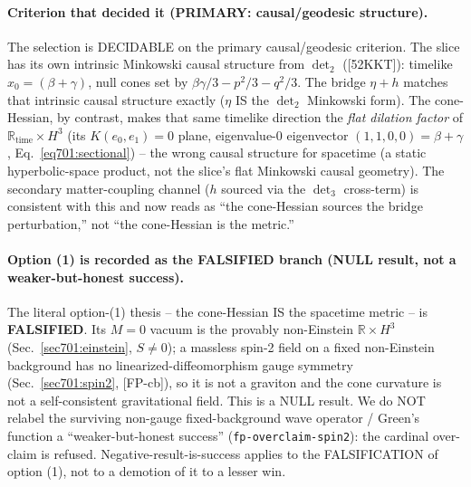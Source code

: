 \paragraph{Criterion that decided it (PRIMARY: causal/geodesic structure).} The selection
is DECIDABLE on the primary causal/geodesic criterion. The slice has its own intrinsic
Minkowski causal structure from $\det_2$ ([52KKT]): timelike $x_0=(\beta+\gamma)$, null
cones set by $\beta\gamma/3-p^2/3-q^2/3$. The bridge $\eta+h$ matches that intrinsic causal
structure exactly ($\eta$ IS the $\det_2$ Minkowski form). The cone-Hessian, by contrast,
makes that same timelike direction the \emph{flat dilation factor} of
$\mathbb{R}_{\text{time}}\times H^3$ (its $K(e_0,e_1)=0$ plane, eigenvalue-$0$ eigenvector
$(1,1,0,0)=\beta+\gamma$, Eq.~\eqref{eq701:sectional}) -- the wrong causal structure for
spacetime (a static hyperbolic-space product, not the slice's flat Minkowski causal
geometry). The secondary matter-coupling channel ($h$ sourced via the $\det_3$ cross-term)
is consistent with this and now reads as ``the cone-Hessian sources the bridge
perturbation,'' not ``the cone-Hessian is the metric.''

\paragraph{Option (1) is recorded as the FALSIFIED branch (NULL result, not a
weaker-but-honest success).} The literal option-(1) thesis -- the cone-Hessian IS the
spacetime metric -- is \textbf{FALSIFIED}. Its $M=0$ vacuum is the provably non-Einstein
$\mathbb{R}\times H^3$ (Sec.~\ref{sec701:einstein}, $S\neq0$); a massless spin-2 field on a
fixed non-Einstein background has no linearized-diffeomorphism gauge symmetry
(Sec.~\ref{sec701:spin2}, [FP-cb]), so it is not a graviton and the cone curvature is not a
self-consistent gravitational field. This is a NULL result. We do NOT relabel the
surviving non-gauge fixed-background wave operator / Green's function a
``weaker-but-honest success'' (\texttt{fp-overclaim-spin2}): the cardinal over-claim is
refused. Negative-result-is-success applies to the FALSIFICATION of option (1), not to a
demotion of it to a lesser win.

